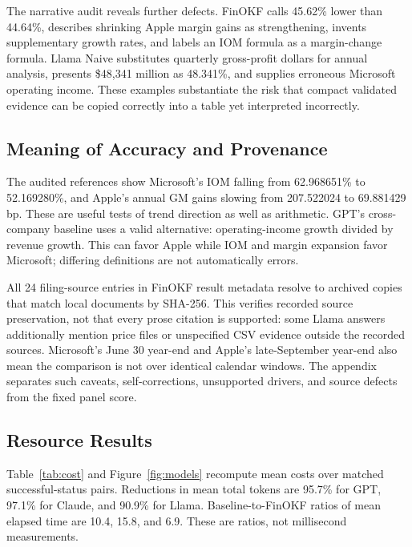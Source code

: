\documentclass[letterpaper]{article} %
\begin{document}
The narrative audit reveals further defects. FinOKF calls 45.62\% lower than 44.64\%, describes shrinking Apple margin gains as strengthening, invents supplementary growth rates, and labels an IOM formula as a margin-change formula. Llama Naive substitutes quarterly gross-profit dollars for annual analysis, presents \$48,341 million as 48.341\%, and supplies erroneous Microsoft operating income. These examples substantiate the risk that compact validated evidence can be copied correctly into a table yet interpreted incorrectly.

\subsection{Meaning of Accuracy and Provenance}
The audited references show Microsoft's IOM falling from 62.968651\% to 52.169280\%, and Apple's annual GM gains slowing from 207.522024 to 69.881429 bp. These are useful tests of trend direction as well as arithmetic. GPT's cross-company baseline uses a valid alternative: operating-income growth divided by revenue growth. This can favor Apple while IOM and margin expansion favor Microsoft; differing definitions are not automatically errors.

All 24 filing-source entries in FinOKF result metadata resolve to archived copies that match local documents by SHA-256. This verifies recorded source preservation, not that every prose citation is supported: some Llama answers additionally mention price files or unspecified CSV evidence outside the recorded sources. Microsoft's June 30 year-end and Apple's late-September year-end also mean the comparison is not over identical calendar windows. The appendix separates such caveats, self-corrections, unsupported drivers, and source defects from the fixed panel score.

\subsection{Resource Results}
Table~\ref{tab:cost} and Figure~\ref{fig:models} recompute mean costs over matched successful-status pairs. Reductions in mean total tokens are 95.7\% for GPT, 97.1\% for Claude, and 90.9\% for Llama. Baseline-to-FinOKF ratios of mean elapsed time are 10.4, 15.8, and 6.9. These are ratios, not millisecond measurements.
\end{document}
